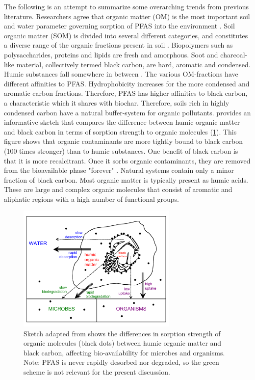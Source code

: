 The following is an attempt to summarize some overarching trends from previous literature. Researchers agree that organic matter (OM) is the most important soil and water parameter governing sorption of PFAS into the environment \citep{zareitalabad2013perfluorooctanoic}. Soil organic matter (SOM) is divided into several different categories, and constitutes a diverse range of the organic fractions present in soil \citep{Cornelissen2005}. Biopolymers such as polysaccharides, proteins and lipids are fresh and amorphous. Soot and charcoal-like material, collectively termed black carbon, are hard, aromatic and condensed. Humic substances fall somewhere in between \citep{cornelissen2004sorption}. The various OM-fractions have different affinities to PFAS. Hydrophobicity increases for the more condensed and aromatic carbon fractions. Therefore, PFAS has higher affinities to black carbon, a characteristic which it shares with biochar. Therefore, soils rich in highly condensed carbon have a natural buffer-system for organic pollutants. \cite{Cornelissen2005} provides an informative sketch that compares the difference between humic organic matter and black carbon in terms of sorption strength to organic molecules (\cref{fig:cornelissen_sorption}). This figure shows that organic contaminants are more tightly bound to black carbon (100 times stronger) than to humic substances. One benefit of black carbon is that it is more recalcitrant. Once it sorbs organic contaminants, they are removed from the bioavailable phase "forever" \citep{Cornelissen2006}. Natural systems contain only a minor fraction of black carbon. Most organic matter is typically present as humic acids. These are large and complex organic molecules that consist of aromatic and aliphatic regions with a high number of functional groups. 

\begin{figure}[htb]
    \centering
    \includegraphics[width=0.7\textwidth]{Diagrams/Cornelissen_sorption.pdf}
    \caption{Sketch adapted from \cite{Cornelissen2005} shows the differences in sorption strength of organic molecules (black dots) between humic organic matter and black carbon, affecting bio-availability for microbes and organisms. Note: PFAS is never rapidly desorbed nor degraded, so the green scheme is not relevant for the present discussion.}
    \label{fig:cornelissen_sorption}
\end{figure}

